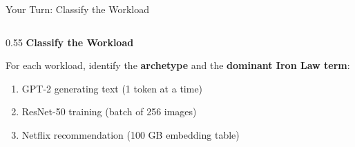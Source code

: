 \documentclass[aspectratio=169, 12pt]{beamer}
\begin{document}
\begin{frame}{Your Turn: Classify the Workload}
\note{
%
%
%
%
}

\small
\begin{columns}[T]
  \begin{column}{0.55\textwidth}
    {\normalsize\bfseries Classify the Workload}

    \vspace{0.2cm}
    For each workload, identify the \textbf{archetype} and the \textbf{dominant Iron Law term}:

    \vspace{0.15cm}
    \begin{enumerate}\setlength\itemsep{3pt}
      \item GPT-2 generating text (1 token at a time)
      \item ResNet-50 training (batch of 256 images)
      \item Netflix recommendation (100 GB embedding table)
    \end{enumerate}


\end{column}
\end{columns}
\end{frame}
\end{document}
